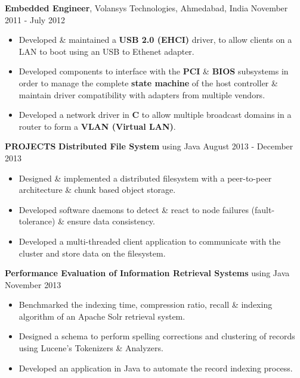 \documentclass[10pt, letterpaper]{article}
\begin{document}
\textbf{Embedded Engineer}, Volansys Technologies, Ahmedabad, India \hfill November 2011 - July 2012
\begin{itemize}
    \item Developed \& maintained a \textbf{USB 2.0 (EHCI)} driver, to allow 
clients on a LAN to boot using an USB to Ethenet adapter.
    \item Developed components to interface with the \textbf{PCI} \& \textbf{BIOS} 
subsystems in order to manage the complete \textbf{state machine} of the host controller
\& maintain driver compatibility with adapters from multiple vendors. 
    \item Developed a network driver in \textbf{C} to allow multiple broadcast 
domains in a router to form a \textbf{VLAN (Virtual LAN)}.
\end{itemize}

\textbf{PROJECTS}
\smallskip 
\newline
\textbf{Distributed File System} using Java \hfill August 2013 - December 2013
\begin{itemize}
    \item Designed \& implemented a distributed filesystem with a peer-to-peer 
architecture \& chunk based object storage.
    \item Developed software daemons to detect \& react to node failures (fault-tolerance) \& ensure data consistency.  
    \item Developed a multi-threaded client application to communicate with the cluster and store data on the filesystem.
\end{itemize}

\textbf{Performance Evaluation of Information Retrieval Systems} using Java \hfill November 2013
\begin{itemize}
    \item Benchmarked the indexing time, compression ratio, recall \& indexing 
algorithm of an Apache Solr retrieval system.
    \item Designed a schema to perform spelling corrections and clustering of 
records using Lucene's Tokenizers \& Analyzers.
    \item Developed an application in Java to automate the record indexing process.
\end{itemize}
\end{document}

